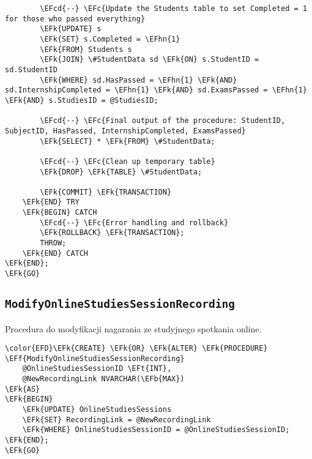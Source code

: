 \documentclass[11pt]{article}
\newcommand{\EFc}[1]{\textcolor{EFc}{\textit{#1}}} %
\newcommand{\EFcd}[1]{\textcolor{EFcd}{\textit{#1}}} %
\newcommand{\EFk}[1]{\textcolor{EFk}{\textbf{#1}}} %
\newcommand{\EFb}[1]{\textcolor{EFb}{\textbf{#1}}} %
\newcommand{\EFf}[1]{\textcolor{EFf}{#1}} %
\newcommand{\EFt}[1]{\textcolor{EFt}{\textbf{#1}}} %
\newcommand{\EFhn}[1]{\textcolor{EFhn}{#1}} %
\begin{document}
\begin{Code}
\begin{Verbatim}
        \EFcd{--} \EFc{Update the Students table to set Completed = 1 for those who passed everything}
        \EFk{UPDATE} s
        \EFk{SET} s.Completed = \EFhn{1}
        \EFk{FROM} Students s
        \EFk{JOIN} \#StudentData sd \EFk{ON} s.StudentID = sd.StudentID
        \EFk{WHERE} sd.HasPassed = \EFhn{1} \EFk{AND} sd.InternshipCompleted = \EFhn{1} \EFk{AND} sd.ExamsPassed = \EFhn{1} \EFk{AND} s.StudiesID = @StudiesID;

        \EFcd{--} \EFc{Final output of the procedure: StudentID, SubjectID, HasPassed, InternshipCompleted, ExamsPassed}
        \EFk{SELECT} * \EFk{FROM} \#StudentData;

        \EFcd{--} \EFc{Clean up temporary table}
        \EFk{DROP} \EFk{TABLE} \#StudentData;

        \EFk{COMMIT} \EFk{TRANSACTION}
    \EFk{END} TRY
    \EFk{BEGIN} CATCH
        \EFcd{--} \EFc{Error handling and rollback}
        \EFk{ROLLBACK} \EFk{TRANSACTION};
        THROW;
    \EFk{END} CATCH
\EFk{END};
\EFk{GO}
\end{Verbatim}
\end{Code}
\subsection{\texttt{ModifyOnlineStudiesSessionRecording}}
\label{sec:org920c53f}
Procedura do modyfikacji nagarania ze studyjnego spotkania online.
\begin{Code}
\begin{Verbatim}
\color{EFD}\EFk{CREATE} \EFk{OR} \EFk{ALTER} \EFk{PROCEDURE} \EFf{ModifyOnlineStudiesSessionRecording}
    @OnlineStudiesSessionID \EFt{INT},
    @NewRecordingLink NVARCHAR(\EFb{MAX})
\EFk{AS}
\EFk{BEGIN}
    \EFk{UPDATE} OnlineStudiesSessions
    \EFk{SET} RecordingLink = @NewRecordingLink
    \EFk{WHERE} OnlineStudiesSessionID = @OnlineStudiesSessionID;
\EFk{END};
\EFk{GO}
\end{Verbatim}
\end{Code}
\end{document}
